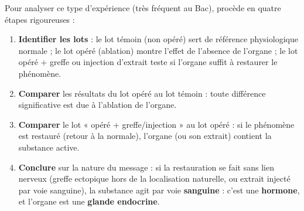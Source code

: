 \documentclass[11pt]{article}
\begin{document}
\begin{methode}
Pour analyser ce type d'expérience (très fréquent au Bac), procède en quatre étapes rigoureuses :
\begin{enumerate}
\item \textbf{Identifier les lots} : le lot témoin (non opéré) sert de référence physiologique normale ; le lot opéré (ablation) montre l'effet de l'absence de l'organe ; le lot opéré + greffe ou injection d'extrait teste si l'organe suffit à restaurer le phénomène.
\item \textbf{Comparer} les résultats du lot opéré au lot témoin : toute différence significative est due à l'ablation de l'organe.
\item \textbf{Comparer} le lot « opéré + greffe/injection » au lot opéré : si le phénomène est restauré (retour à la normale), l'organe (ou son extrait) contient la substance active.
\item \textbf{Conclure} sur la nature du message : si la restauration se fait sans lien nerveux (greffe ectopique hors de la localisation naturelle, ou extrait injecté par voie sanguine), la substance agit par voie \textbf{sanguine} : c'est une \textbf{hormone}, et l'organe est une \textbf{glande endocrine}.
\end{enumerate}
\end{methode}
\end{document}
